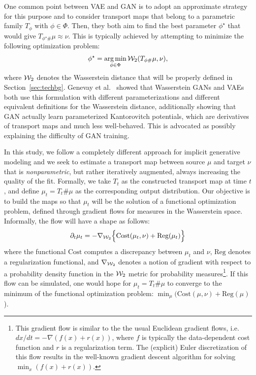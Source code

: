 One common point between VAE and GAN is to adopt an approximate strategy for this purpose and to consider transport maps that belong to a parametric family $T_{\phi}$ with $\phi \in \Phi$. Then, they both aim to find the best parameter $\phi^\star$ that would give $T_{\phi^\star \#}\mu \approx \nu$. This is typically achieved by attempting to minimize the following optimization problem:
\begin{align}
\phi^\star = \operatorname*{arg\min}_{\phi \in \Phi} {\cal W}_2(T_{\phi \#}\mu, \nu),
\end{align}
where ${\cal W}_2$ denotes the Wasserstein distance that will be properly defined in Section~\ref{sec:techbg}. Genevay et al.\ \cite{genevay2017gan} showed that Wasserstein GANs \cite{arjovsky2017wasserstein} and VAEs both use this formulation with different parameterizations and different equivalent definitions for the Wasserstein distance, additionally showing that GAN actually learn parameterized Kantorovitch potentials, which are derivatives of transport maps and much less well-behaved. This is advocated as possibly explaining the difficulty of GAN training.

In this study, we follow a completely different approach for implicit generative modeling and we seek to estimate a transport map between source $\mu$ and target $\nu$ that is \textit{nonparametric}, but rather iteratively augmented, always increasing the quality of the fit. Formally, we take $T_t$ as the constructed transport map at time $t$, and define $\mu_t=T_t \# \mu$ as the corresponding output distribution. Our objective is to build the maps so that $\mu_t$ will be the solution of a functional optimization problem, defined through gradient flows for measures in the Wasserstein space. Informally, the flow will have a shape as follows:
\begin{align}
\partial_t \mu_t = - \nabla_{{\cal W}_2} \Bigl\{ \mathrm{Cost}(\mu_t, \nu) + \mathrm{Reg}(\mu_t)\Bigr\} \label{eqn:gradflow}
\end{align}
where the functional $\mathrm{Cost}$ computes a discrepancy between $\mu_t$ and $\nu$, $\mathrm{Reg}$ denotes a regularization functional, and $\nabla_{{\cal W}_2}$ denotes a notion of gradient with respect to a probability density function in the ${\cal W}_2$ metric for probability measures\footnote{This gradient flow is similar to the the usual Euclidean gradient flows, i.e.\ $dx/dt = - \nabla (f(x) + r(x))$, where $f$ is typically the data-dependent cost function and $r$ is a regularization term. The (explicit) Euler discretization of this flow results in the well-known gradient descent algorithm for solving $\min_x (f(x)+r(x))$.}. If this flow can be simulated, one would hope for $\mu_t=T_t\#\mu$ to converge to the minimum of the functional optimization problem: $\min_\mu ( \mathrm{Cost}(\mu, \nu) + \mathrm{Reg}(\mu)$).

